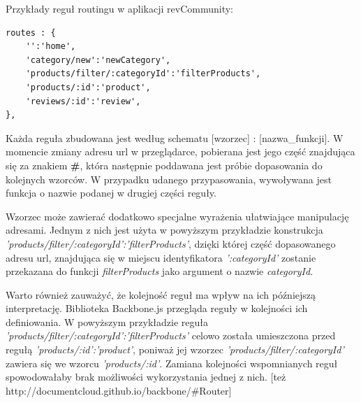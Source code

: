 Przykłady reguł routingu w aplikacji revCommunity:

\begin{lstlisting}
routes : {
	'':'home',
	'category/new':'newCategory',
	'products/filter/:categoryId':'filterProducts',
	'products/:id':'product',
	'reviews/:id':'review',
},
\end{lstlisting}

Każda reguła zbudowana jest według schematu [wzorzec] : [nazwa\_funkcji]. W momencie zmiany adresu url w przeglądarce, pobierana jest jego część znajdująca się za znakiem \textbf{\#}, która następnie poddawana jest próbie dopasowania do kolejnych wzorców. W przypadku udanego przypasowania, wywoływana jest funkcja o nazwie podanej w drugiej części reguły.

Wzorzec może zawierać dodatkowo specjalne wyrażenia ułatwiające manipulację adresami. Jednym z nich jest użyta w powyższym przykładzie konstrukcja \textit{'products/filter/:categoryId':'filterProducts'}, dzięki której część dopasowanego adresu url, znajdująca się w miejscu identyfikatora \textit{':categoryId'} zostanie przekazana do funkcji \textit{filterProducts} jako argument o nazwie \textit{categoryId}.

Warto również zauważyć, że kolejność reguł ma wpływ na ich późniejszą interpretację. Biblioteka Backbone.js przegląda reguły w kolejności ich definiowania. W powyższym przykładzie reguła \textit{'products/filter/:categoryId':'filterProducts'} celowo została umieszczona przed regułą \textit{'products/:id':'product'}, poniważ jej wzorzec \textit{'products/filter/:categoryId'} zawiera się we wzorcu \textit{'products/:id'}. Zamiana kolejności wspomnianych reguł spowodowałaby brak możliwości wykorzystania jednej z nich. [też http://documentcloud.github.io/backbone/\#Router]
